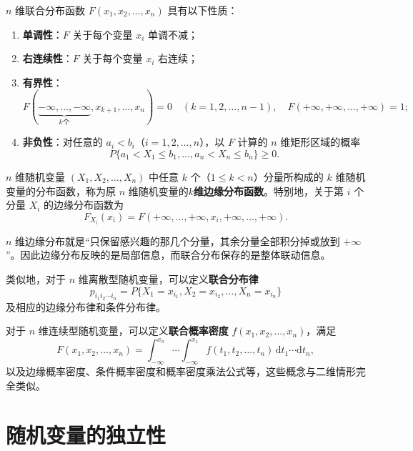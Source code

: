 ﻿\documentclass[lang=cn,11pt]{elegantbook}
\begin{document}
\begin{property}[$n$维联合分布函数的性质]\label{prop:n-joint-df-property}
$n$ 维联合分布函数 $F(x_1, x_2, \dots, x_n)$ 具有以下性质：
\begin{enumerate}
    \item \textbf{单调性}：$F$ 关于每个变量 $x_i$ 单调不减；
    \item \textbf{右连续性}：$F$ 关于每个变量 $x_i$ 右连续；
    \item \textbf{有界性}：
    \[
    F(\underbrace{-\infty, \dots, -\infty}_{k\text{个}}, x_{k+1}, \dots, x_n) = 0 \quad (k=1,2,\dots,n-1), \quad F(+\infty, +\infty, \dots, +\infty) = 1;
    \]
    \item \textbf{非负性}：对任意的 $a_i < b_i$（$i=1,2,\dots,n$），以 $F$ 计算的 $n$ 维矩形区域的概率
    \[
    P\{a_1 < X_1 \leqslant b_1, \dots, a_n < X_n \leqslant b_n\} \geqslant 0.
    \]
\end{enumerate}
\end{property}

\begin{definition}[$n$维边缘分布函数]\label{def:n-marginal-df}
$n$ 维随机变量 $(X_1, X_2, \dots, X_n)$ 中任意 $k$ 个（$1 \leqslant k < n$）分量所构成的 $k$ 维随机变量的分布函数，称为原 $n$ 维随机变量的\textbf{$k$维边缘分布函数}。特别地，关于第 $i$ 个分量 $X_i$ 的边缘分布函数为
\[
F_{X_i}(x_i) = F(+\infty, \dots, +\infty, x_i, +\infty, \dots, +\infty).
\]
\end{definition}

\begin{note}
$n$ 维边缘分布就是“只保留感兴趣的那几个分量，其余分量全部积分掉或放到 $+\infty$”。因此边缘分布反映的是局部信息，而联合分布保存的是整体联动信息。
\end{note}

类似地，对于 $n$ 维离散型随机变量，可以定义\textbf{联合分布律} \[p_{i_1 i_2 \cdots i_n} = P\{X_1 = x_{i_1}, X_2 = x_{i_2}, \dots, X_n = x_{i_n}\}\] 及相应的边缘分布律和条件分布律。

对于 $n$ 维连续型随机变量，可以定义\textbf{联合概率密度} $f(x_1, x_2, \dots, x_n)$，满足
\[
F(x_1, x_2, \dots, x_n) = \int_{-\infty}^{x_n}\cdots\int_{-\infty}^{x_1}f(t_1, t_2, \dots, t_n)\,\mathrm{d}t_1\cdots\mathrm{d}t_n,
\]
以及边缘概率密度、条件概率密度和概率密度乘法公式等，这些概念与二维情形完全类似。

\section{随机变量的独立性}
\end{document}
